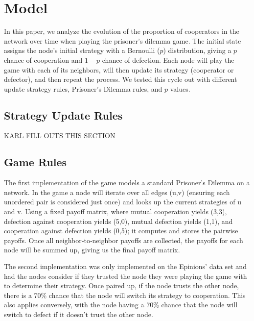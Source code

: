 \section{Model}

In this paper, we analyze the evolution of the proportion of cooperators in the network over time when playing the prisoner's dilemma game. The initial state assigns the node’s initial strategy with a Bernoulli (\(p\)) distribution, giving a \(p\) chance of cooperation and \(1-p\) chance of defection. Each node will play the game with each of its neighbors, will then update its strategy (cooperator or defector), and then repeat the process. We tested this cycle out with different update strategy rules, Prisoner's Dilemma rules, and \(p\) values. 

\subsection{Strategy Update Rules}
KARL FILL OUTS THIS SECTION

\subsection{Game Rules}
The first implementation of the game models a standard Prisoner's Dilemma on a network. In the game a node will iterate over all edges (u,v) (ensuring each unordered pair is considered just once) and looks up the current strategies of u and v. Using a fixed payoff matrix, where mutual cooperation yields (3,3), defection against cooperation yields (5,0), mutual defection yields (1,1), and cooperation against defection yields (0,5); it computes and stores the pairwise payoffs. Once all neighbor‐to‐neighbor payoffs are collected, the payoffs for each node will be summed up, giving us the final payoff matrix.

The second implementation was only implemented on the Epinions' data set and had the nodes consider if they trusted the node they were playing the game with to determine their strategy. Once paired up, if the node trusts the other node, there is a 70\% chance that the node will switch its strategy to cooperation. This also applies conversely, with the node having a 70\% chance that the node will switch to defect if it doesn't trust the other node. 
